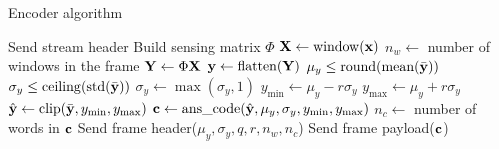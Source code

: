 \begin{algorithm}[H]
\caption{Encoder algorithm}
\label{alg:encoder}
\footnotesize
\SetAlgoLined
Send stream header \;
Build sensing matrix $\Phi$\;
 {
    $\mathbf{X} \leftarrow \mathrm{window}(\mathbf{x})$ \;
    $n_w \leftarrow$ number of windows in the frame \;
    $\mathbf{Y} \leftarrow \Phi \mathbf{X}$\;
    $\mathbf{y} \leftarrow \mathrm{flatten}(\mathbf{Y})$\;
    $\mu_y \leq \mathrm{round}(\text{mean}(\bar{\mathbf{y}}))$ \;
    $\sigma_y \leq \mathrm{ceiling}(\text{std}(\bar{\mathbf{y}}))$ \;
    $\sigma_y \leftarrow \max(\sigma_y, 1)$\;
     {
        $y_{\min} \leftarrow \mu_y  - r \sigma_y$ \;
        $y_{\max} \leftarrow \mu_y  + r \sigma_y$ \;
        $\hat{\mathbf{y}} \leftarrow \mathrm{clip}(\bar{\mathbf{y}}, y_{\min}, y_{\max})$\;
    }
    $\mathbf{c} \leftarrow \text{ans\_code}(\hat{\mathbf{y}}, \mu_y, \sigma_y, y_{\min}, y_{\max})$ \;
    $n_c \leftarrow$ number of words in $\mathbf{c}$\;
    Send frame header($\mu_y, \sigma_y, q, r, n_w, n_c$)\;
    Send frame payload($\mathbf{c}$)\;
}
\end{algorithm}
